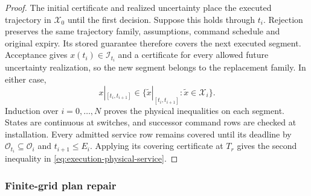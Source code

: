 \documentclass[preprint,12pt]{elsarticle}
\begin{document}
\begin{proof}
The initial certificate and realized uncertainty place the executed
trajectory in $\mathcal X_0$ until the first decision. Suppose this holds
through $t_i$. Rejection preserves the same trajectory family, assumptions,
command schedule and original expiry. Its stored guarantee therefore
covers the next executed segment. Acceptance gives
$x(t_i)\in\mathcal I_{t_i}$ and a certificate for every allowed future
uncertainty realization, so the new segment belongs to the replacement
family. In either case,
\[
x|_{[t_i,t_{i+1}]}\in
\{\widetilde x|_{[t_i,t_{i+1}]}:\widetilde x\in\mathcal X_i\}.
\]
Induction over $i=0,\ldots,N$ proves the physical inequalities on each
segment. States are continuous at switches, and successor command rows are
checked at installation. Every admitted service row remains covered until
its deadline by $\mathcal O_{t_i}\subseteq\mathcal O_i$ and
$t_{i+1}\le E_i$. Applying its covering certificate at $T_r$ gives the
second inequality in \eqref{eq:execution-physical-service}.
\end{proof}

\subsubsection{Finite-grid plan repair}
\label{sec:predictive-repair}
\end{document}

